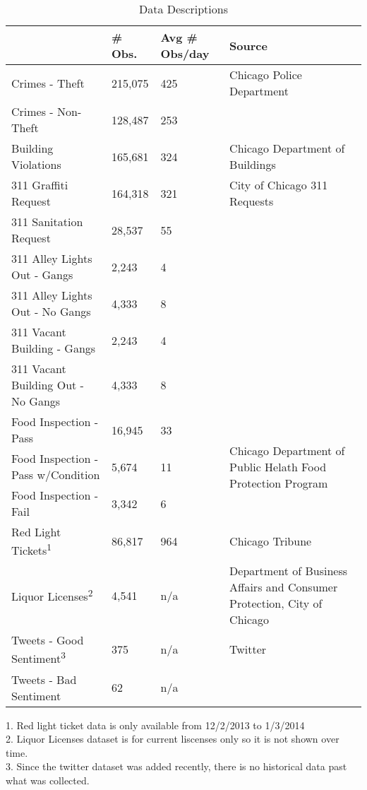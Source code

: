\documentclass{article}
\begin{document}
\begin{table}
\begin{threeparttable}
\caption{Data Descriptions}
\begin{tabular}{ |p{6cm}||p{2cm}|p{3cm}|p{6cm}|  }
 \hline
 \hline
 & \# Obs. &  Avg \# Obs/day & Source\\
 \hline
 Crimes - Theft                      & 215,075    & 425     & Chicago Police Department \\
 Crimes - Non-Theft                  & 128,487    & 253     & \\
 \hline
 Building Violations                 & 165,681    & 324     & Chicago Department of Buildings\\
 \hline
 311 Graffiti Request                & 164,318    & 321     & City of Chicago 311 Requests \\
 311 Sanitation Request              & 28,537     & 55      & \\
 311 Alley Lights Out - Gangs        & 2,243      & 4       & \\
 311 Alley Lights Out - No Gangs     & 4,333      & 8       & \\
 311 Vacant Building - Gangs         & 2,243      & 4       & \\
 311 Vacant Building Out - No Gangs  & 4,333      & 8       & \\
 \hline
 Food Inspection - Pass              & 16,945     & 33 & \multirow{3}{4cm}{Chicago Department of Public Helath Food Protection Program} \\ 
 Food Inspection - Pass w/Condition  & 5,674      & 11 & \\ 
 Food Inspection - Fail              & 3,342      & 6  & \\ 
 \hline
 Red Light Tickets\textsuperscript{1}                   & 86,817     & 964     & Chicago Tribune\\
 \hline
 Liquor Licenses\textsuperscript{2}                     & 4,541      & n/a     & Department of Business Affairs and Consumer Protection, City of Chicago\\
 \hline
 Tweets - Good Sentiment\textsuperscript{3}          & 375        & n/a     & Twitter\\
 Tweets - Bad Sentiment                & 62         & n/a      & \\
 \hline
\end{tabular}
\begin{tablenotes}
      \small
      \item 1. Red light ticket data is only available from 12/2/2013 to 1/3/2014 \\
          2. Liquor Licenses dataset is for current liscenses only so it is not shown over time. \\
          3. Since the twitter dataset was added recently, there is no historical data past what was collected.
    \end{tablenotes}
    \end{threeparttable}
\end{table}
\end{document}
